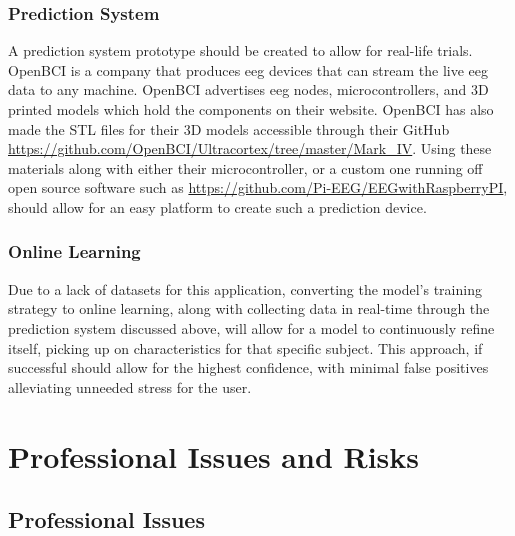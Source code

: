 \documentclass[12pt]{article}
\begin{document}
\subsubsection{Prediction System}

A prediction system prototype should be created to allow for real-life trials. OpenBCI is a company that produces \acrshort{eeg} devices that can stream the live \acrshort{eeg} data to any machine. OpenBCI advertises \acrshort{eeg} nodes, microcontrollers, and 3D printed models which hold the components on their website. OpenBCI has also made the STL files for their 3D models accessible through their GitHub \url{https://github.com/OpenBCI/Ultracortex/tree/master/Mark_IV}. Using these materials along with either their microcontroller, or a custom one running off open source software such as \url{https://github.com/Pi-EEG/EEGwithRaspberryPI}, should allow for an easy platform to create such a prediction device.


\subsubsection{Online Learning}


Due to a lack of datasets for this application, converting the model's training strategy to online learning, along with collecting data in real-time through the prediction system discussed above, will allow for a model to continuously refine itself, picking up on characteristics for that specific subject. This approach, if successful should allow for the highest confidence, with minimal false positives alleviating unneeded stress for the user.


\section{Professional Issues and Risks}

\subsection{Professional Issues}\label{issues}
\end{document}
